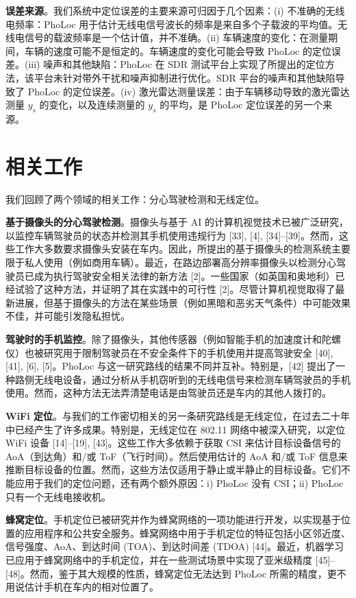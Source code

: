 \documentclass[journal, onecolumn]{IEEEtran}
\begin{document}
\textbf{误差来源}。我们系统中定位误差的主要来源可归因于几个因素：(i) 不准确的无线电频率：PhoLoc 用于估计无线电信号波长的频率是来自多个子载波的平均值。无线电信号的载波频率是一个估计值，并不准确。(ii) 车辆速度的变化：在测量期间，车辆的速度可能不是恒定的。车辆速度的变化可能会导致 PhoLoc 的定位误差。(iii) 噪声和其他缺陷：PhoLoc 在 SDR 测试平台上实现了所提出的定位方法，该平台未针对带外干扰和噪声抑制进行优化。SDR 平台的噪声和其他缺陷导致了 PhoLoc 的定位误差。(iv) 激光雷达测量误差：由于车辆移动导致的激光雷达测量 $y_{s}$ 的变化，以及连续测量的 $y_{s}$ 的平均，是 PhoLoc 定位误差的另一个来源。

\section{相关工作}
我们回顾了两个领域的相关工作：分心驾驶检测和无线定位。

\textbf{基于摄像头的分心驾驶检测}。摄像头与基于 AI 的计算机视觉技术已被广泛研究，以监控车辆驾驶员的状态并检测其手机使用违规行为 [33], [4], [34]–[39]。然而，这些工作大多数要求摄像头安装在车内。因此，所提出的基于摄像头的检测系统主要限于私人使用（例如商用车辆）。最近，在路边部署高分辨率摄像头以检测分心驾驶员已成为执行驾驶安全相关法律的新方法 [2]。一些国家（如英国和奥地利）已经试验了这种方法，并证明了其在实践中的可行性 [2]。尽管计算机视觉取得了最新进展，但基于摄像头的方法在某些场景（例如黑暗和恶劣天气条件）中可能效果不佳，并可能引发隐私担忧。

\textbf{驾驶时的手机监控}。除了摄像头，其他传感器（例如智能手机的加速度计和陀螺仪）也被研究用于限制驾驶员在不安全条件下的手机使用并提高驾驶安全 [40], [41], [6], [5]。PhoLoc 与这一研究路线的结果不同并互补。特别是，[42] 提出了一种路侧无线电设备，通过分析从手机窃听到的无线电信号来检测车辆驾驶员的手机使用。然而，这种方法无法弄清楚电话是由驾驶员还是车内的其他人拨打的。

\textbf{WiFi 定位}。与我们的工作密切相关的另一条研究路线是无线定位，在过去二十年中已经产生了许多成果。特别是，无线定位在 802.11 网络中被深入研究，以定位 WiFi 设备 [14]–[19], [43]。这些工作大多依赖于获取 CSI 来估计目标设备信号的 AoA（到达角）和/或 ToF（飞行时间）。然后使用估计的 AoA 和/或 ToF 信息来推断目标设备的位置。然而，这些方法仅适用于静止或半静止的目标设备。它们不能应用于我们的定位问题，还有两个额外原因：i) PhoLoc 没有 CSI；ii) PhoLoc 只有一个无线电接收机。

\textbf{蜂窝定位}。手机定位已被研究并作为蜂窝网络的一项功能进行开发，以实现基于位置的应用程序和公共安全服务。蜂窝网络中用于手机定位的特征包括小区邻近度、信号强度、AoA、到达时间 (TOA)、到达时间差 (TDOA) [44]。最近，机器学习已应用于蜂窝网络中的手机定位，并在一些测试场景中实现了亚米级精度 [45]–[48]。然而，鉴于其大规模的性质，蜂窝定位无法达到 PhoLoc 所需的精度，更不用说估计手机在车内的相对位置了。
\end{document}
